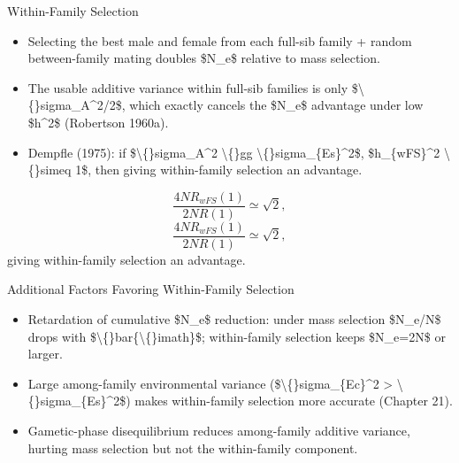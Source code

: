\documentclass[10pt, aspectratio=169]{ctexbeamer}
\begin{document}
\begin{frame}{Within-Family Selection}
  \begin{itemize}
    \item Selecting the best male and female from each full-sib family + random between-family mating doubles \$N\_e\$ relative to mass selection.
    \item The usable additive variance within full-sib families is only \$\textbackslash\{\}sigma\_A\textasciicircum{}2/2\$, which exactly cancels the \$N\_e\$ advantage under low \$h\textasciicircum{}2\$ (Robertson 1960a).
    \item Dempfle (1975): if \$\textbackslash\{\}sigma\_A\textasciicircum{}2 \textbackslash\{\}gg \textbackslash\{\}sigma\_\{Es\}\textasciicircum{}2\$, \$h\_\{wFS\}\textasciicircum{}2 \textbackslash\{\}simeq 1\$, then giving within-family selection an advantage.
  \end{itemize}
  \[
    \frac{4N R_{wFS}(1)}{2N R(1)} \simeq \sqrt{2},
  \]
  \[
    \frac{4N R_{wFS}(1)}{2N R(1)} \simeq \sqrt{2}, \] giving within-family selection an advantage.
  \]
\end{frame}

\begin{frame}{Additional Factors Favoring Within-Family Selection}
  \begin{itemize}
    \item Retardation of cumulative \$N\_e\$ reduction: under mass selection \$N\_e/N\$ drops with \$\textbackslash\{\}bar\{\textbackslash\{\}imath\}\$; within-family selection keeps \$N\_e=2N\$ or larger.
    \item Large among-family environmental variance (\$\textbackslash\{\}sigma\_\{Ec\}\textasciicircum{}2 > \textbackslash\{\}sigma\_\{Es\}\textasciicircum{}2\$) makes within-family selection more accurate (Chapter 21).
    \item Gametic-phase disequilibrium reduces among-family additive variance, hurting mass selection but not the within-family component.
  \end{itemize}
\end{frame}
\end{document}
